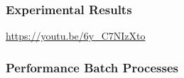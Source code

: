 \begin{frame}
    \frametitle{Experimental Results}
    \centering
    \LARGE
    \textcolor{blue}{\url{https://youtu.be/6y\_C7NIzXto}}
\end{frame}

\begin{frame}
    \frametitle{Performance Batch Processes}
    \begin{figure}[h]
        \centering
        \resizebox{0.9\textwidth}{!}{}
    \end{figure}
\end{frame}

